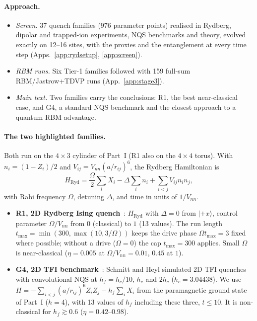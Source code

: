 \documentclass[11pt,a4paper]{article}
\begin{document}
\paragraph{Approach.}
\begin{itemize}
  \item \emph{Screen.} 37 quench families (976 parameter points) realised in Rydberg, dipolar and trapped-ion
    experiments, NQS benchmarks and theory, evolved exactly on 12--16 sites, with the proxies and the entanglement at
    every time step (Apps.~\ref{app:rydsetup}, \ref{app:screen}).
  \item \emph{RBM runs.} Six Tier-1 families followed with 159 full-sum RBM/Jastrow+TDVP runs (App.~\ref{app:stage3}).
  \item \emph{Main text.} Two families carry the conclusions: R1, the best near-classical case, and G4, a standard NQS
    benchmark and the closest approach to a quantum RBM advantage.
\end{itemize}

\paragraph{The two highlighted families.} Both run on the $4\times3$ cylinder of Part~I (R1 also on the $4\times4$
torus). With $n_i=(1-Z_i)/2$ and $V_{ij}=V_{nn}(a/r_{ij})^6$, the Rydberg Hamiltonian is
\begin{equation}
  H_{\mathrm{Ryd}}=\frac\Omega2\sum_iX_i-\Delta\sum_in_i+\sum_{i<j}V_{ij}n_in_j ,
\end{equation}
with Rabi frequency $\Omega$, detuning $\Delta$, and time in units of $1/V_{nn}$.
\begin{itemize}
  \item \textbf{R1, 2D Rydberg Ising quench}~\cite{Lienhard18,GuardadoSanchez18}: $H_{\mathrm{Ryd}}$ with $\Delta=0$
    from $|{+}x\rangle$, control parameter $\Omega/V_{nn}$ from $0$ (classical) to $1$ (13 values). The run length
    $t_{\max}=\min(300,\max(10,3/\Omega))$ keeps the drive phase $\Omega t_{\max}=3$ fixed where possible; without a
    drive ($\Omega=0$) the cap $t_{\max}=300$ applies.
    Small $\Omega$ is near-classical ($\eta=0.005$ at $\Omega/V_{nn}=0.01$, $0.45$ at $1$).
  \item \textbf{G4, 2D TFI benchmark}~\cite{SchmittHeyl20}: Schmitt and Heyl simulated 2D TFI quenches with
    convolutional NQS at $h_f=h_c/10$, $h_c$ and $2h_c$ ($h_c=3.04438$). We use $H=-\sum_{i<j}(a/r_{ij})^6Z_iZ_j-h_f\sum_iX_i$
    from the paramagnetic ground state of Part~I ($h=4$), with 13 values of $h_f$ including these three, $t\le10$. It
    is non-classical for $h_f\gtrsim0.6$ ($\eta=0.42$--$0.98$).
\end{itemize}
\end{document}
